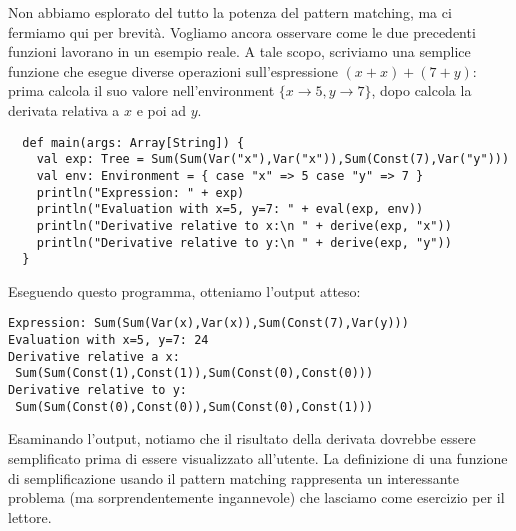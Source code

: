 Non abbiamo esplorato del tutto la potenza del pattern matching, ma ci fermiamo qui per brevit\`a. Vogliamo ancora osservare come le due precedenti funzioni lavorano in un esempio reale. A tale scopo, scriviamo una semplice funzione  che esegue diverse operazioni sull'espressione $(x+x)+(7+y)$: prima calcola il suo valore nell'environment $\{x\rightarrow 5, y\rightarrow 7\}$, dopo calcola la derivata relativa a $x$ e poi ad $y$.
\begin{lstlisting}
  def main(args: Array[String]) {
    val exp: Tree = Sum(Sum(Var("x"),Var("x")),Sum(Const(7),Var("y")))
    val env: Environment = { case "x" => 5 case "y" => 7 }
    println("Expression: " + exp)
    println("Evaluation with x=5, y=7: " + eval(exp, env))
    println("Derivative relative to x:\n " + derive(exp, "x"))
    println("Derivative relative to y:\n " + derive(exp, "y"))
  }
\end{lstlisting}
Eseguendo questo programma, otteniamo l'output atteso:
\begin{verbatim}
Expression: Sum(Sum(Var(x),Var(x)),Sum(Const(7),Var(y)))
Evaluation with x=5, y=7: 24
Derivative relative a x:
 Sum(Sum(Const(1),Const(1)),Sum(Const(0),Const(0)))
Derivative relative to y:
 Sum(Sum(Const(0),Const(0)),Sum(Const(0),Const(1)))
\end{verbatim}
Esaminando l'output, notiamo che il risultato della derivata dovrebbe essere semplificato prima di essere visualizzato all'utente. La definizione di una funzione di semplificazione usando il pattern matching rappresenta un interessante problema (ma sorprendentemente ingannevole) che lasciamo come esercizio per il lettore.